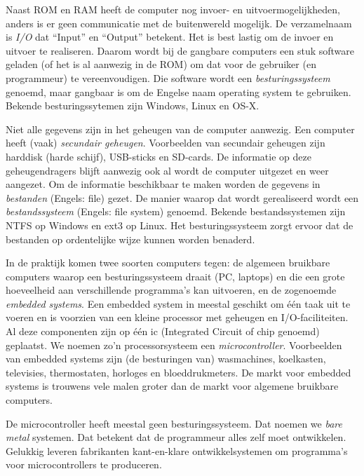 Naast ROM en RAM heeft de computer nog invoer- en uitvoermogelijkheden, anders is er geen communicatie met de buitenwereld mogelijk. De verzamelnaam is \textsl{I/O} dat ``Input'' en ``Output'' betekent. Het is best lastig om de invoer en uitvoer te realiseren. Daarom wordt bij de gangbare computers een stuk software geladen (of het is al aanwezig in de ROM) om dat voor de gebruiker (en programmeur) te vereenvoudigen. Die software wordt een \textsl{besturingssysteem} genoemd, maar gangbaar is om de Engelse naam operating system te gebruiken. Bekende besturingssytemen zijn Windows, Linux en OS-X.

Niet alle gegevens zijn in het geheugen van de computer aanwezig. Een computer heeft (vaak) \textsl{secundair geheugen}. Voorbeelden van secundair geheugen zijn harddisk (harde schijf), USB-sticks en SD-cards. De informatie op deze geheugendragers blijft aanwezig ook al wordt de computer uitgezet en weer aangezet. Om de informatie beschikbaar te maken worden de gegevens in \textsl{bestanden} (Engels: file) gezet. De manier waarop dat wordt gerealiseerd wordt een \textsl{bestandssysteem} (Engels: file system) genoemd. Bekende bestandssystemen zijn NTFS op Windows en ext3 op Linux. Het besturingssysteem zorgt ervoor dat de bestanden op ordentelijke wijze kunnen worden benaderd.

In de praktijk komen twee soorten computers tegen: de algemeen bruikbare computers waarop een besturingssysteem draait (PC, laptops) en die een grote hoeveelheid aan verschillende programma's kan uitvoeren, en de zogenoemde \textsl{embedded systems}. Een embedded system in meestal geschikt om één taak uit te voeren en is voorzien van een kleine processor met geheugen en I/O-faciliteiten. Al deze componenten zijn op één ic (Integrated Circuit of chip genoemd) geplaatst. We noemen zo'n processorsysteem een \textsl{microcontroller}. Voorbeelden van embedded systems zijn (de besturingen van) wasmachines, koelkasten, televisies, thermostaten, horloges en bloeddrukmeters. De markt voor embedded systems is trouwens vele malen groter dan de markt voor algemene bruikbare computers.

De microcontroller heeft meestal geen besturingssysteem. Dat noemen we \textsl{bare metal} systemen. Dat betekent dat de programmeur alles zelf moet ontwikkelen. Gelukkig leveren fabrikanten kant-en-klare ontwikkelsystemen om programma's voor microcontrollers te produceren.


